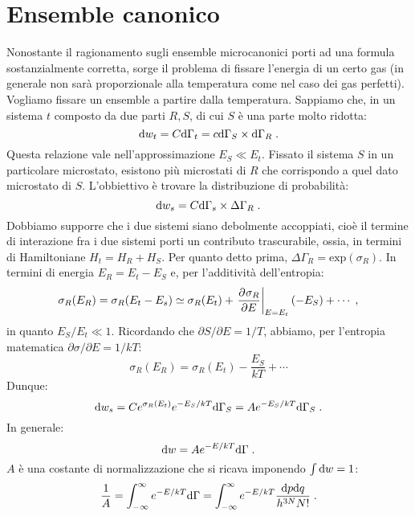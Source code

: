 \section{Ensemble canonico}
Nonostante il ragionamento sugli ensemble microcanonici porti ad una formula sostanzialmente corretta, sorge il problema di fissare l'energia di un certo gas (in generale non sarà proporzionale alla temperatura come nel caso dei gas perfetti). Vogliamo fissare un ensemble a partire dalla temperatura. Sappiamo che, in un sistema $t$ composto da due parti $R,S$, di cui $S$ è una parte molto ridotta:
\begin{equation}
\diff[w]_t=C\diff[\Gamma_t]=c\diff[\Gamma_S]\times\diff[\Gamma_R]\;.
\end{equation}
Questa relazione vale nell'approssimazione $E_S\ll E_t$. Fissato il sistema $S$ in un particolare microstato, esistono più microstati di $R$ che corrispondo a quel dato microstato di $S$. L'obbiettivo è trovare la distribuzione di probabilità:
\begin{equation}
\diff{w_s}=C\diff{\Gamma_s}\times\Delta\Gamma_R\;.
\end{equation}
Dobbiamo supporre che i due sistemi siano debolmente accoppiati, cioè il termine di interazione fra i due sistemi porti un contributo trascurabile, ossia, in termini di Hamiltoniane $H_t=H_R+H_S$. Per quanto detto prima, $\Delta\Gamma_R=\mathrm{exp}(\sigma_R)$. In termini di energia $E_R=E_t-E_S$ e, per l'additività dell'entropia:
\begin{equation}
\sigma_R(E_R)=\sigma_R(E_t-E_s)\simeq \sigma_R(E_t)+\left.\pdev{\sigma_R}{E}\right|_{E=E_t}(-E_S)+\cdots\;,
\end{equation}
in quanto $E_S/E_t\ll 1$. Ricordando che $\partial S/\partial E=1/T$, abbiamo, per l'entropia matematica $\partial\sigma/\partial E=1/kT$:
\begin{equation}
\sigma_R(E_R)=\sigma_R(E_t)-\frac{E_S}{kT}+\cdots
\end{equation}
Dunque:
\begin{equation}
\diff{w_s}=Ce^{\sigma_R(E_t)}e^{-E_S/kT}\diff{\Gamma_S}=Ae^{-E_S/kT}\diff{\Gamma_S}\;.
\end{equation}
In generale:
\begin{equation}
\diff{w}=Ae^{-E/kT}\diff{\Gamma}\;.
\end{equation}
$A$ è una costante di normalizzazione che si ricava imponendo $\int\diff{w}=1$:
\begin{equation}
\frac{1}{A}=\int_{-\infty}^{\infty} e^{-E/kT}\diff{\Gamma}=\int_{-\infty}^{\infty} e^{-E/kT}\frac{\diff{p}\diff{q}}{h^{3N}N!}\;.
\end{equation}
